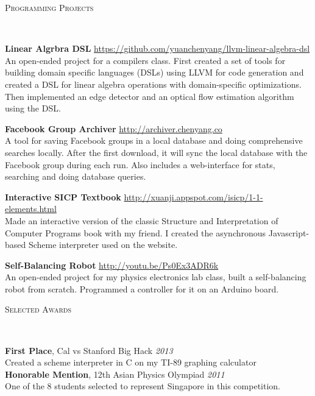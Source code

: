 \documentclass[9pt]{article}
\newenvironment{changemargin}[2]{%
  \begin{list}{}{%
      \setlength{\topsep}{0pt}%
      \setlength{\leftmargin}{#1}%
      \setlength{\rightmargin}{#2}%
      \setlength{\listparindent}{\parindent}%
      \setlength{\itemindent}{\parindent}%
      \setlength{\parsep}{\parskip}%
    }%
  \item[]}{\end{list}
}
\newcommand{\lineover}{
  \begin{changemargin}{-0.05in}{-0.05in}
    \vspace*{-8pt}
    \hrulefill \\
    \vspace*{-2pt}
  \end{changemargin}
}
\newcommand{\header}[1]{
  \begin{changemargin}{-0.5in}{-0.5in}
    \scshape{#1}\\
    \lineover
  \end{changemargin}
}
\newenvironment{body} {
  \vspace*{-16pt}
  \begin{changemargin}{-0.25in}{-0.5in}
  }
  {\end{changemargin}
}
\begin{document}
\smallskip

\header{Programming Projects}

\begin{body}
  \vspace{14pt}

  \textbf{Linear Algrbra DSL} \hfill \url{https://github.com/yuanchenyang/llvm-linear-algebra-dsl} \\
  An open-ended project for a compilers class. First created a set of tools for
  building domain specific languages (DSLs) using LLVM for code generation and
  created a DSL for linear algebra operations with domain-specific
  optimizations. Then implemented an edge detector and an optical flow
  estimation algorithm using the DSL.  \medskip

  \textbf{Facebook Group Archiver} \hfill \url{http://archiver.chenyang.co}\\
  A tool for saving Facebook groups in a local database and doing comprehensive
  searches locally. After the first download, it will sync the local database
  with the Facebook group during each run. Also includes a web-interface for
  stats, searching and doing database queries. \\
  \medskip

  \textbf{Interactive SICP Textbook} \hfill
  \url{http://xuanji.appspot.com/isicp/1-1-elements.html}\\
  Made an interactive version of the classic Structure and Interpretation of
  Computer Programs book with my friend. I created the asynchronous
  Javascript-based Scheme interpreter used on the website. \\
  \medskip

  \textbf{Self-Balancing Robot} \hfill \url{http://youtu.be/Ps0Ex3ADR6k} \\
  An open-ended project for my physics electronics lab class, built a
  self-balancing robot from scratch. Programmed a controller for it on an
  Arduino board. \\
  \medskip

\end{body}

\smallskip


\header{Selected Awards}
\begin{body}
  \vspace{14pt}
  \textbf{First Place}, Cal vs Stanford Big Hack \hfill{} \emph{2013}\\
  Created a scheme interpreter in C on my TI-89 graphing calculator \\
  \textbf{Honorable Mention}, 12th Asian Physics Olympiad \hfill{} \emph{2011}\\
  One of the 8 students selected to represent Singapore in this competition.\\
\end{body}
\end{document}
